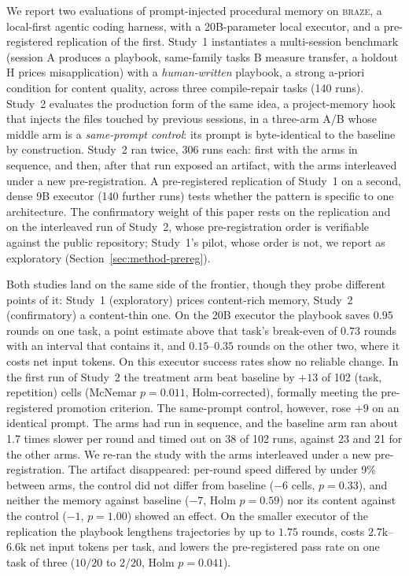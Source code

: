\documentclass[smallcondensed,natbib]{svjour3}
\newcommand{\braze}{\textsc{braze}}
\begin{document}
We report two evaluations of prompt-injected procedural memory on
\braze{}, a local-first agentic coding harness, with a 20B-parameter
local executor, and a pre-registered replication of the first. Study~1
instantiates a multi-session benchmark (session A produces a
playbook, same-family tasks B measure transfer, a holdout H prices
misapplication) with a \emph{human-written} playbook, a strong a-priori condition for
content quality, across three compile-repair tasks (140 runs). Study~2 evaluates the production form of the same
idea, a project-memory hook that injects the files touched by previous
sessions, in a three-arm A/B whose middle arm is a \emph{same-prompt
control}: its prompt is byte-identical to the baseline by construction.
Study~2 ran twice, 306 runs each: first with the arms in sequence, and
then, after that run exposed an artifact, with the arms interleaved
under a new pre-registration. A pre-registered replication of Study~1
on a second, dense 9B executor (140 further runs) tests whether the
pattern is specific to one architecture. The confirmatory weight of
this paper rests on the replication and on the interleaved run of
Study~2, whose pre-registration order is verifiable against the public
repository; Study~1's pilot, whose order is not, we report as
exploratory (Section~\ref{sec:method-prereg}).

Both studies land on the same side of the frontier, though they probe
different points of it: Study~1 (exploratory) prices content-rich
memory, Study~2 (confirmatory) a content-thin one. On the 20B executor
the playbook saves $0.95$ rounds on one task, a point estimate above
that task's break-even of $0.73$ rounds with an interval that contains
it, and $0.15$--$0.35$ rounds on the other two, where it costs net
input tokens. On this executor success rates show no reliable change.
In the first run of Study~2 the treatment arm beat baseline by $+13$
of 102 (task, repetition) cells (McNemar $p=0.011$, Holm-corrected),
formally meeting the pre-registered promotion criterion. The
same-prompt control, however, rose $+9$ on an identical prompt. The
arms had run in sequence, and the baseline arm ran about 1.7 times
slower per round and timed out on 38 of 102 runs, against 23 and 21
for the other arms. We re-ran the study with the arms interleaved
under a new pre-registration. The artifact disappeared: per-round
speed differed by under 9\% between arms, the control did not differ
from baseline ($-6$ cells, $p=0.33$), and neither the memory against
baseline ($-7$, Holm $p=0.59$) nor its content against the control
($-1$, $p=1.00$) showed an effect. On the smaller executor of the replication the playbook
lengthens trajectories by up to $1.75$ rounds, costs $2.7$k--$6.6$k
net input tokens per task, and lowers the pre-registered pass rate on
one task of three ($10/20$ to $2/20$, Holm $p=0.041$).
\end{document}

